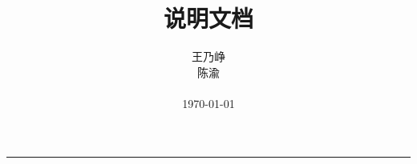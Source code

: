 \documentclass[a4paper,cs4size,oneside,cap]{ctexrep}
\title{\fontsize{50}{50}\selectfont%
    \vspace*{2cm}%
    \hfil \ucore 说明文档%
    \vspace*{2cm}%
}
\author{
    \hfill 王乃峥 \\
    \hfill 陈\hspace{1em}渝 \\
    \hfill \\
    \hfill \today \\
}
\makeatletter
\def\printtitle{%
    {\centering\@title}}
\def\printauthor{%
    {\centering\large\@author}}
\newcommand{\newpart}[1]{ \clearpage}
\makeatother
\begin{document}
\setlength{\parindent}{2em}
\setlength{\baselineskip}{1.4em}
\setlength{\parskip}{1ex}

\thispagestyle{empty}

\begin{center}
    \colorbox{Grey}{
        \parbox[t]{\textwidth}{
            \printtitle
        } 
	}
\end{center}

\vspace*{0.4\textheight}
\printauthor
\hfill\rule{0.24\linewidth}{0.6pt}
\clearpage

\tableofcontents
\clearpage

\setcounter{page}{1}

\newpart{part0}
\newpart{part1}
    
\makeatletter
\listoftables
\listoffigures
\makeatother
\end{document}

